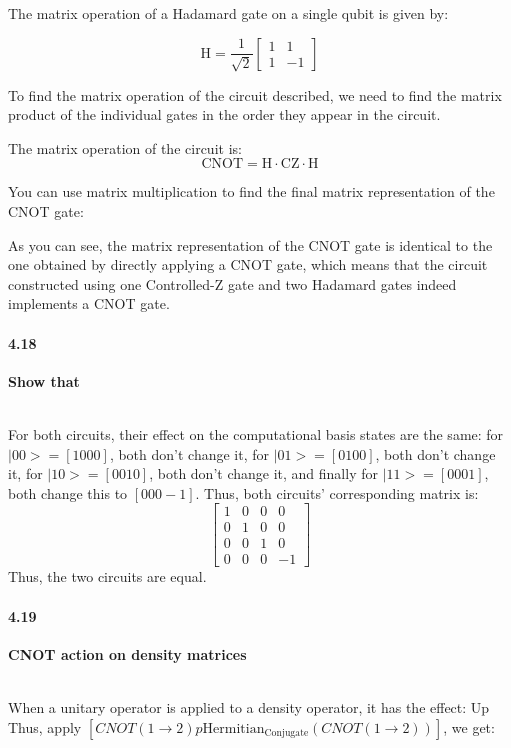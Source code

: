 The matrix operation of a Hadamard gate on a single qubit is given by:

$$\text{H} = \frac{1}{\sqrt{2}} \begin{bmatrix}1 & 1 \\ 1 & -1\end{bmatrix}$$

To find the matrix operation of the circuit described, we need to find the matrix product of the individual gates in the order they appear in the circuit.

The matrix operation of the circuit is:
$$\text{CNOT} = \text{H} \cdot \text{CZ} \cdot \text{H}$$

You can use matrix multiplication to find the final matrix representation of the CNOT gate:


As you can see, the matrix representation of the CNOT gate is identical to the one obtained by directly applying a CNOT gate, which means that the circuit constructed using one Controlled-Z gate and two Hadamard gates indeed implements a CNOT gate.


\paragraph{4.18} \textbf{Show that}

\\

For both circuits, their effect on the computational basis states are the same: for $|00> = [1 0 0 0]$, both don’t change it, for $|01> = [0 1 0 0]$, both don’t change it, for $|10> = [0 0 1 0]$, both don’t change it, and finally for $|11> = [0 0 0 1]$, both change this to $[0 0 0 -1]$. Thus, both circuits’ corresponding matrix is:
$$\begin{bmatrix}1 & 0 & 0 & 0 \\
0 & 1 & 0 & 0 \\
0 & 0 & 1 & 0 \\
0 & 0 & 0 & -1\end{bmatrix}$$
Thus, the two circuits are equal.

\paragraph{4.19} \textbf{CNOT action on density matrices}

\\

When a unitary operator is applied to a density operator, it has the effect: Up
Thus, apply $[CNOT(1 \rightarrow 2) p \text{Hermitian}_\text{Conjugate} (CNOT(1 \rightarrow 2))]$, we get:


